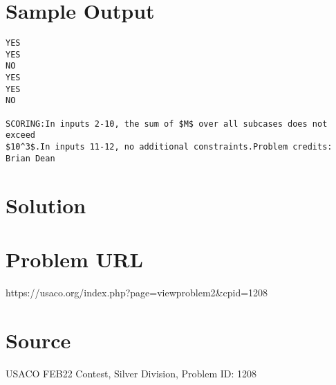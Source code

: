 \documentclass[12pt]{article}
\begin{document}
\section*{Sample Output}
\begin{verbatim}
YES
YES
NO
YES
YES
NO

SCORING:In inputs 2-10, the sum of $M$ over all subcases does not exceed
$10^3$.In inputs 11-12, no additional constraints.Problem credits: Brian Dean
\end{verbatim}

\section*{Solution}


\section*{Problem URL}
https://usaco.org/index.php?page=viewproblem2&cpid=1208

\section*{Source}
USACO FEB22 Contest, Silver Division, Problem ID: 1208
\end{document}
